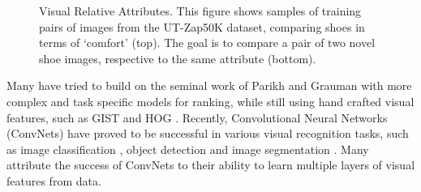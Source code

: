 \begin{figure}
{}
\caption{Visual Relative Attributes. This figure shows samples of training pairs of images from the UT-Zap50K dataset, comparing shoes in terms of `comfort' (top). The goal is to compare a pair of two novel shoe images, respective to the same attribute (bottom).}
\label{fig.1}
\end{figure}

Many have tried to build on the seminal work of Parikh and Grauman \cite{parikh2011} with more complex and task specific models for ranking, while still using hand crafted visual features, such as GIST \cite{Aude01} and HOG \cite{hog}. Recently, Convolutional Neural Networks (ConvNets) have proved to be successful in various visual recognition tasks, such as image classification \cite{krizshevsky}, object detection \cite{RCNN} and image segmentation \cite{fullyconv}. Many attribute the success of ConvNets to their ability to learn multiple layers of visual features from data. 

